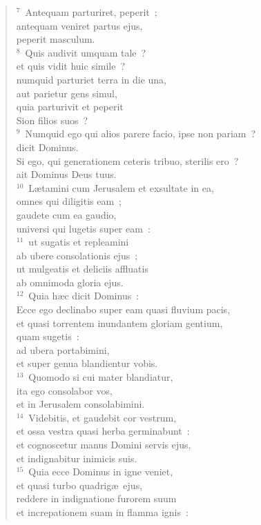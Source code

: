 \begin{flushleft}
\begin{verse}
${}^{7}$~Antequam parturiret, peperit~;\\ antequam veniret partus ejus,\\ peperit masculum.\\
${}^{8}$~Quis audivit umquam tale~?\\ et quis vidit huic simile~?\\ numquid parturiet terra in die una,\\ aut parietur gens simul,\\ quia parturivit et peperit\\ Sion filios suos~?\\
${}^{9}$~Numquid ego qui alios parere facio, ipse non pariam~?\\ dicit Dominus.\\ Si ego, qui generationem ceteris tribuo, sterilis ero~?\\ ait Dominus Deus tuus.\\
${}^{10}$~L\ae tamini cum Jerusalem et exsultate in ea,\\ omnes qui diligitis eam~;\\ gaudete cum ea gaudio,\\ universi qui lugetis super eam~:\\
${}^{11}$~ut sugatis et repleamini\\ ab ubere consolationis ejus~;\\ ut mulgeatis et deliciis affluatis\\ ab omnimoda gloria ejus.\\
${}^{12}$~Quia h\ae c dicit Dominus~:\\ Ecce ego declinabo super eam quasi fluvium pacis,\\ et quasi torrentem inundantem gloriam gentium,\\ quam sugetis~:\\ ad ubera portabimini,\\ et super genua blandientur vobis.\\
${}^{13}$~Quomodo si cui mater blandiatur,\\ ita ego consolabor vos,\\ et in Jerusalem consolabimini.\\
${}^{14}$~Videbitis, et gaudebit cor vestrum,\\ et ossa vestra quasi herba germinabunt~:\\ et cognoscetur manus Domini servis ejus,\\ et indignabitur inimicis suis.\\
${}^{15}$~Quia ecce Dominus in igne veniet,\\ et quasi turbo quadrig\ae\ ejus,\\ reddere in indignatione furorem suum\\ et increpationem suam in flamma ignis~:\\

\end{verse}
\end{flushleft}
